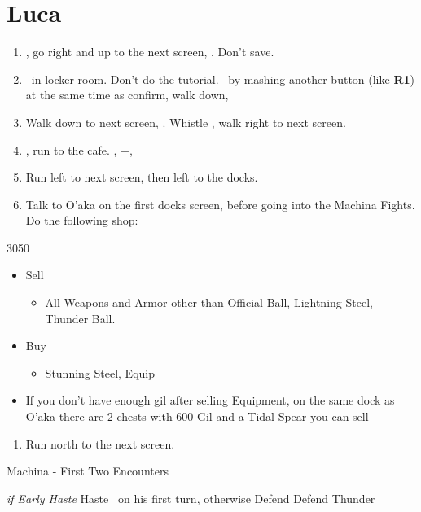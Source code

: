 \chapter{Luca}

\begin{enumerate}
    \item \sd, go right and up to the next screen, \cs[2:30]. Don't save.
    \item \sd\ in locker room. Don't do the tutorial. \sd\ by mashing another button (like \textbf{R1}) at the same time as confirm, walk down, \sd
    \item Walk down to next screen, \sd. Whistle \cs[0:30], walk right to next screen.
    \item \sd, run to the cafe. \sd, \skippablefmv+\cs[1:20], \sd
    \item Run left to next screen, then left to the docks.
    \item Talk to O'aka on the first docks screen, before going into the Machina Fights. Do the following shop:
\end{enumerate}
\begin{shop}{3050}
    \begin{itemize}
        \item Sell
        \begin{itemize}
            \item All Weapons and Armor other than Official Ball, Lightning Steel, Thunder Ball.
        \end{itemize}
        \item Buy
        \begin{itemize}
            \item Stunning Steel, Equip
        \end{itemize}
        \item If you don't have enough gil after selling Equipment, on the same dock as O'aka there are 2 chests with 600 Gil and a Tidal Spear you can sell
    \end{itemize}
\end{shop}
\begin{enumerate}[resume]
    \item Run north to the next screen.
\end{enumerate}
\begin{battle}{Machina - First Two Encounters}
    \begin{itemize}
        \tidusf \textit{if Early Haste} Haste \lulu\ on his first turn, otherwise Defend
        \kimahrif Defend
        \luluf Thunder
    \end{itemize}
\end{battle}
